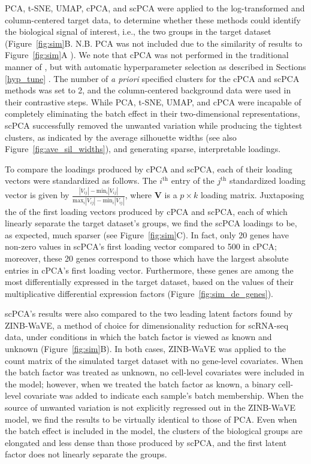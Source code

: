 PCA, t-SNE, UMAP, cPCA, and scPCA were applied to the log-transformed and column-centered target data, to determine whether these methods could identify the biological signal of interest, i.e., the two groups in the target dataset (Figure~\ref{fig:sim}B. N.B. PCA was not included due to the similarity of results to Figure~\ref{fig:sim}A ). We note that cPCA was not performed in the traditional manner of \citet{Abid2018}, but with automatic hyperparameter selection as described in Sections \ref{hyp_tune} . The number of \textit{a priori} specified clusters for the cPCA and scPCA methods was set to 2, and the column-centered background data were used in their contrastive steps. While PCA, t-SNE, UMAP,  and cPCA were incapable of completely eliminating the batch effect in their two-dimensional representations, scPCA successfully removed the unwanted variation while producing the tightest clusters, as indicated by the average silhouette widths (see also Figure~\ref{fig:ave_sil_widths}), and generating sparse, interpretable loadings.

To compare the loadings produced by cPCA and scPCA, each of their loading vectors were standardized as follows. The $i^{\text{th}}$ entry of the $j^{\text{th}}$ standardized loading vector is given by 
$
\frac{|V_{ij}| - \text{min}_i |V_{ij}|}{\text{max}_i |V_{ij}| - \text{min}_i |V_{ij}|}
$, 
where $\mathbf{V}$ is a $p \times k$ loading matrix. 
Juxtaposing the  of the first loading vectors produced by cPCA and scPCA, each of which linearly separate the target dataset's groups, we find the scPCA loadings to be, as expected, much sparser (see Figure~\ref{fig:sim}C). In fact, only 20 genes have non-zero values in scPCA's first loading vector compared to 500 in cPCA; moreover, these 20 genes correspond to those which have the largest absolute entries in cPCA's first loading vector. Furthermore, these genes are among the most differentially expressed in the target dataset, based on the values of their multiplicative differential expression factors (Figure~\ref{fig:sim_de_genes}).

scPCA's results were also compared to the two leading latent factors found by ZINB-WaVE, a method of choice for dimensionality reduction for scRNA-seq data, under conditions in which the batch factor is viewed as known and unknown (Figure~\ref{fig:sim}B). In both cases, ZINB-WaVE was applied to the count matrix of the simulated target dataset with no gene-level covariates. When the batch factor was treated as unknown, no cell-level covariates were included in the model; however, when we treated the batch factor as known, a binary cell-level covariate was added to indicate each sample's batch membership. When the source of unwanted variation is not explicitly regressed out in the ZINB-WaVE model, we find the results to be virtually identical to those of PCA. Even when the batch effect is included in the model, the clusters of the biological groups are elongated and less dense than those produced by scPCA, and the first latent factor does not linearly separate the groups.


